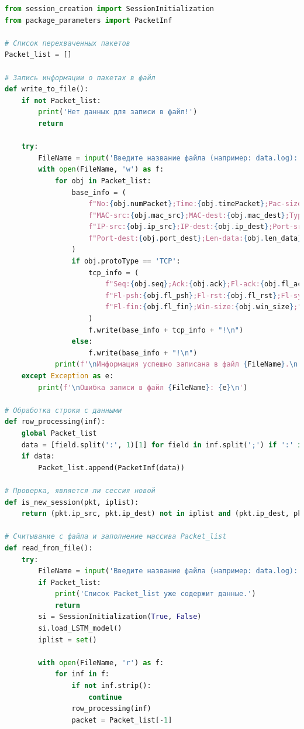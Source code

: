 \documentclass[bachelor, och, coursework]{SCWorks}
\begin{document}
    \begin{lstlisting}[language=Python]
from session_creation import SessionInitialization
from package_parameters import PacketInf

# Список перехваченных пакетов
Packet_list = []

# Запись информации о пакетах в файл
def write_to_file():
    if not Packet_list:
        print('Нет данных для записи в файл!')
        return
    
    try:
        FileName = input('Введите название файла (например: data.log): ')
        with open(FileName, 'w') as f:
            for obj in Packet_list:
                base_info = (
                    f"No:{obj.numPacket};Time:{obj.timePacket};Pac-size:{obj.packetSize};"
                    f"MAC-src:{obj.mac_src};MAC-dest:{obj.mac_dest};Type:{obj.protoType};"
                    f"IP-src:{obj.ip_src};IP-dest:{obj.ip_dest};Port-src:{obj.port_src};"
                    f"Port-dest:{obj.port_dest};Len-data:{obj.len_data};"
                )
                if obj.protoType == 'TCP':
                    tcp_info = (
                        f"Seq:{obj.seq};Ack:{obj.ack};Fl-ack:{obj.fl_ack};"
                        f"Fl-psh:{obj.fl_psh};Fl-rst:{obj.fl_rst};Fl-syn:{obj.fl_syn};"
                        f"Fl-fin:{obj.fl_fin};Win-size:{obj.win_size};"
                    )
                    f.write(base_info + tcp_info + "!\n")
                else:
                    f.write(base_info + "!\n")
            print(f'\nИнформация успешно записана в файл {FileName}.\n')
    except Exception as e:
        print(f'\nОшибка записи в файл {FileName}: {e}\n')

# Обработка строки с данными
def row_processing(inf):
    global Packet_list
    data = [field.split(':', 1)[1] for field in inf.split(';') if ':' in field]
    if data:
        Packet_list.append(PacketInf(data))

# Проверка, является ли сессия новой
def is_new_session(pkt, iplist):
    return (pkt.ip_src, pkt.ip_dest) not in iplist and (pkt.ip_dest, pkt.ip_src) not in iplist

# Считывание с файла и заполнение массива Packet_list
def read_from_file():
    try:
        FileName = input('Введите название файла (например: data.log): ')
        if Packet_list:
            print('Список Packet_list уже содержит данные.')
            return
        si = SessionInitialization(True, False)
        si.load_LSTM_model()
        iplist = set()
        
        with open(FileName, 'r') as f:
            for inf in f:
                if not inf.strip():
                    continue
                row_processing(inf)
                packet = Packet_list[-1]
                

\end{lstlisting}
\end{document}
